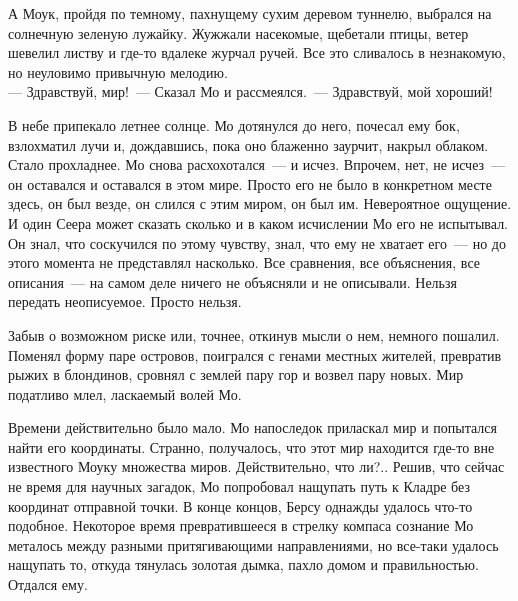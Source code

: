\newpage 

А Моук, пройдя по темному, пахнущему сухим деревом туннелю, выбрался на 
солнечную зеленую лужайку. Жужжали насекомые, щебетали птицы, ветер шевелил 
листву и где-то вдалеке журчал ручей. Все это сливалось в незнакомую, но 
неуловимо привычную мелодию.\\
--- Здравствуй, мир!~--- Сказал Мо и рассмеялся.~--- Здравствуй, мой хороший!

В небе припекало летнее солнце. Мо дотянулся до него, почесал ему бок, 
взлохматил лучи и, дождавшись, пока оно блаженно заурчит, накрыл облаком. Стало 
прохладнее. Мо снова расхохотался~--- и исчез. Впрочем, нет, не исчез~--- он 
оставался и оставался в этом мире. Просто его не было в конкретном месте здесь, 
он был везде, он слился с этим миром, он был им. Невероятное ощущение. И один 
Сеера может сказать сколько и в каком исчислении Мо его не испытывал. Он знал, 
что соскучился по этому чувству, знал, что ему не хватает его~--- но до этого 
момента не представлял насколько. Все сравнения, все объяснения, все 
описания~--- на самом деле ничего не объясняли и не описывали. Нельзя передать неописуемое. 
Просто нельзя.

Забыв о возможном риске или, точнее, откинув мысли о нем, немного пошалил. 
Поменял форму паре островов, поигрался с генами местных жителей, превратив 
рыжих в блондинов, сровнял с землей пару гор и возвел пару новых. Мир податливо млел, 
ласкаемый волей Мо.

Времени действительно было мало. Мо напоследок приласкал мир и попытался найти 
его координаты. Странно, получалось, что этот мир находится где-то вне 
известного Моуку множества миров. Действительно, что ли?.. Решив, что сейчас не 
время для научных загадок, Мо попробовал нащупать путь к Кладре без координат 
отправной точки. В конце концов, Берсу однажды удалось что-то подобное. 
Некоторое время превратившееся в стрелку компаса сознание Мо металось между 
разными притягивающими направлениями, но все-таки удалось нащупать то, откуда 
тянулась золотая дымка, пахло домом и правильностью. Отдался ему.


